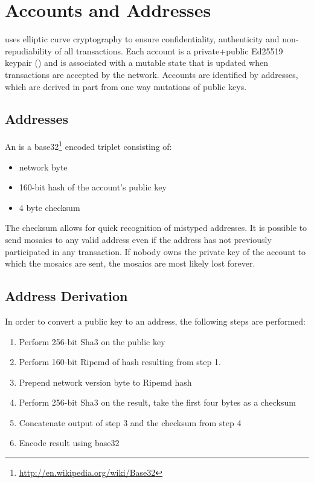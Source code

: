 \section{Accounts and Addresses}
\label{sec:accounts}

\nemquote{
}{}

\codenamechapterfirstword uses elliptic curve cryptography to ensure confidentiality, authenticity and non-repudiability of all transactions.
Each account is a private+public Ed25519 keypair () and is associated with a mutable state that is updated when transactions are accepted by the network.
Accounts are identified by addresses, which are derived in part from one way mutations of public keys.

\subsection{Addresses}

An  is a base32\footnote{ \url{http://en.wikipedia.org/wiki/Base32} } encoded triplet consisting of:
\begin{itemize}
	\item{network byte}
	\item{160-bit hash of the account's public key}
	\item{4 byte checksum}
\end{itemize}

The checksum allows for quick recognition of mistyped addresses.
It is possible to send mosaics to any valid address even if the address has not previously participated in any transaction.
If nobody owns the private key of the account to which the mosaics are sent, the mosaics are most likely lost forever.

\subsection{Address Derivation}
In order to convert a public key to an address, the following steps are performed:
\begin{enumerate}
	\item{Perform 256-bit Sha3 on the public key}
	\item{Perform 160-bit Ripemd of hash resulting from step 1.}
	\item{Prepend network version byte to Ripemd hash}
	\item{Perform 256-bit Sha3 on the result, take the first four bytes as a checksum}
	\item{Concatenate output of step 3 and the checksum from step 4}
	\item{Encode result using base32}
\end{enumerate}

